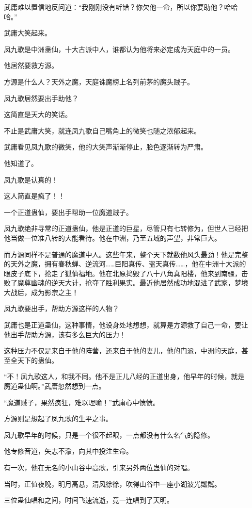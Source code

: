 \begin{this_body}
武庸难以置信地反问道：“我刚刚没有听错？你欠他一命，所以你要助他？哈哈哈。”

武庸大笑起来。

凤九歌是中洲蛊仙，十大古派中人，谁都认为他将来必定成为天庭中的一员。

他居然要救方源。

方源是什么人？天外之魔，天庭诛魔榜上名列前茅的魔头贼子。

凤九歌居然要出手助他？

这简直是天大的笑话。

不止是武庸大笑，就连凤九歌自己嘴角上的微笑也随之浓郁起来。

武庸看见凤九歌的微笑，他的大笑声渐渐停止，脸色逐渐转为严肃。

他知道了。

凤九歌是认真的！

这人简直是疯了！！

一个正道蛊仙，要出手帮助一位魔道贼子。

凤九歌绝非寻常的正道蛊仙，他是正道的巨星，尽管只有七转修为，但世人已经把他当做一位准八转的大能看待。他在中洲，乃至五域的声望，非常巨大。

而方源同样不是普通的魔道中人。这些年来，整个天下就数他风头最劲！他是完整的天外之魔，拥有春秋蝉、逆流河……巨阳真传、盗天真传……，他在中洲十大派的眼皮子底下，抢走了狐仙福地。他在北原捣毁了八十八角真阳楼，他来到南疆，击败了魔尊幽魂的逆天大计，抢夺了胜利果实。最近他居然成功地混进了武家，梦境大战后，成为影宗之主！

凤九歌要出手，帮助方源这样的人物？

武庸也是正道蛊仙，这种事情，他设身处地想想，就算是方源救了自己一命，要让他出手帮助方源，该有多么巨大的压力！

这种压力不仅是来自于他的阵营，还来自于他的妻儿，他的门派，中洲的天庭，甚至全天下的蛊仙。

“不！凤九歌这人，和我不同。他不是正儿八经的正道出身，他早年的时候，就是魔道蛊仙啊。”武庸忽然想到一点。

“魔道贼子，果然疯狂，难以理喻！”武庸心中愤愤。

方源则是想起了凤九歌的生平之事。

凤九歌早年的时候，只是一个很不起眼，一点都没有什么名气的隐修。

他专修音道，矢志不渝，向其中投注生命。

有一次，他在无名的小山谷中高歌，引来另外两位蛊仙的对唱。

当时，正值夜晚，明月高悬，清风徐徐，吹得山谷中一座小湖波光粼粼。

三位蛊仙唱和之间，时间飞速流逝，竟一连唱到了天明。


\end{this_body}
